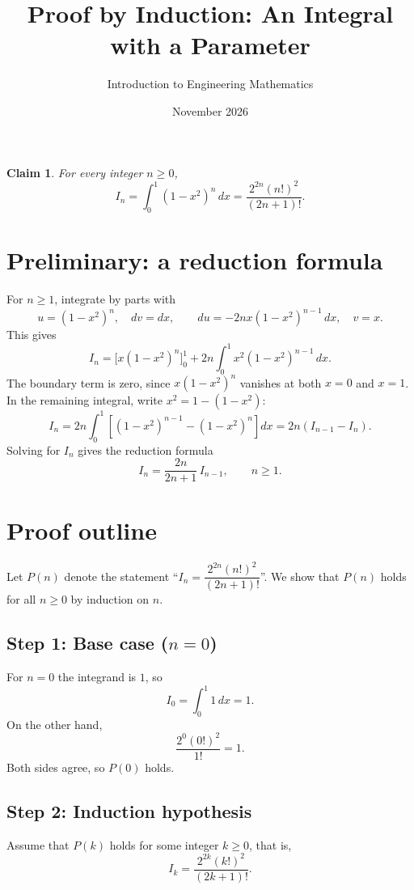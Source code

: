\documentclass{article}
\title{Proof by Induction: An Integral with a Parameter}
\author{Introduction to Engineering Mathematics}
\date{November 2026}
\newtheorem*{claim}{Claim}
\begin{document}
\maketitle

\begin{claim}
  For every integer $n \ge 0$,
  \[
    I_n = \int_0^1 (1 - x^2)^n \, dx = \frac{2^{2n} (n!)^2}{(2n + 1)!}.
  \]
\end{claim}

\section*{Preliminary: a reduction formula}

For $n \ge 1$, integrate by parts with
\[
  u = (1 - x^2)^n, \quad dv = dx,
  \qquad
  du = -2nx (1 - x^2)^{n-1} \, dx, \quad v = x.
\]
This gives
\[
  I_n = \Big[ x (1 - x^2)^n \Big]_0^1 + 2n \int_0^1 x^2 (1 - x^2)^{n-1} \, dx.
\]
The boundary term is zero, since $x (1 - x^2)^n$ vanishes at both $x = 0$ and
$x = 1$. In the remaining integral, write $x^2 = 1 - (1 - x^2)$:
\[
  I_n = 2n \int_0^1 \left[ (1 - x^2)^{n-1} - (1 - x^2)^n \right] dx
      = 2n \left( I_{n-1} - I_n \right).
\]
Solving for $I_n$ gives the reduction formula
\[
  I_n = \frac{2n}{2n + 1} \, I_{n-1}, \qquad n \ge 1.
\]

\section*{Proof outline}

Let $P(n)$ denote the statement ``$I_n = \dfrac{2^{2n} (n!)^2}{(2n + 1)!}$''.
We show that $P(n)$ holds for all $n \ge 0$ by induction on $n$.

\subsection*{Step 1: Base case ($n = 0$)}

For $n = 0$ the integrand is $1$, so
\[
  I_0 = \int_0^1 1 \, dx = 1.
\]
On the other hand,
\[
  \frac{2^0 (0!)^2}{1!} = 1.
\]
Both sides agree, so $P(0)$ holds.

\subsection*{Step 2: Induction hypothesis}

Assume that $P(k)$ holds for some integer $k \ge 0$, that is,
\[
  I_k = \frac{2^{2k} (k!)^2}{(2k + 1)!}.
\]
\end{document}
